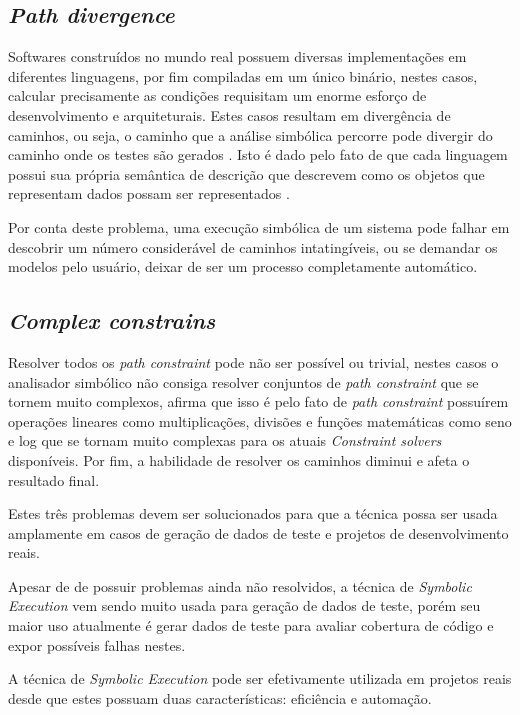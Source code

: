\documentclass[
	12pt,				%
	oneside,			%
	a4paper,			%
	english,			%
	brazil				%
	]{abntex2ppgsi}
\begin{document}
\subsection{\textit{Path divergence}}
Softwares construídos no mundo real possuem diversas implementações em diferentes linguagens, por fim compiladas em um único binário, nestes casos, calcular precisamente as condições requisitam um enorme esforço de desenvolvimento e arquiteturais. Estes casos resultam em divergência de caminhos, ou seja, o caminho que a análise simbólica percorre pode divergir do caminho onde os testes são gerados \cite{Anand2013}. Isto é dado pelo fato de que cada linguagem possui sua própria semântica de descrição que descrevem como os objetos que representam dados possam ser representados \cite{King1976}.

Por conta deste problema, uma execução simbólica de um sistema pode falhar em descobrir um número considerável de caminhos intatingíveis, ou se demandar os modelos pelo usuário, deixar de ser um processo completamente automático.

\subsection{\textit{Complex constrains}}
Resolver todos os \textit{path constraint} pode não ser possível ou trivial, nestes casos o analisador simbólico não consiga resolver conjuntos de \textit{path constraint} que se tornem muito complexos, \cite{Anand2013} afirma que isso é pelo fato de \textit{path constraint} possuírem operações lineares como multiplicações, divisões e funções matemáticas como seno e log que se tornam muito complexas para os atuais \textit{Constraint solvers} disponíveis. Por fim, a habilidade de resolver os caminhos diminui e afeta o resultado final.


Estes três problemas devem ser solucionados para que a técnica possa ser usada amplamente em casos de geração de dados de teste e projetos de desenvolvimento reais.

Apesar de de possuir problemas ainda não resolvidos, a técnica de \textit{Symbolic Execution} vem sendo muito usada para geração de dados de teste, porém seu maior uso atualmente é gerar dados de teste para avaliar cobertura de código e expor possíveis falhas nestes.

A técnica de \textit{Symbolic Execution} pode ser efetivamente utilizada em projetos reais desde que estes possuam duas características: eficiência e automação.
\end{document}
